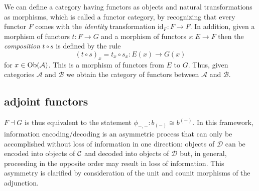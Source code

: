 \begin{frame}
We can define a category having functors as objects and natural transformations as morphisms, which is called a functor category, by recognizing that every functor $F$ comes with the {\it identity} transformation $\text{id}_F : F \to F$. In addition, given a morphism of
functors $t : F \to G$ and a morphism of functors $s : E \to F$
then the {\it composition} $t \circ s$ is defined by the rule
$$
(t \circ s)_x = t_x \circ s_x : E(x) \to G(x)
$$
for $x \in \mathop{\rm Ob}\nolimits(\mathcal{A})$.
This is a morphism of functors
from $E$ to $G$.
Thus, given categories
$\mathcal{A}$ and $\mathcal{B}$ we obtain the category of functors between $\mathcal{A}$ and
$\mathcal{B}$.
\end{frame}


\subsection{adjoint functors}


\begin{frame}
$F \dashv G$ is thus equivalent to the statement $\phi_{-,-}:b_{(-)} \cong b^{(-)}$. In this framework, information encoding/decoding is an asymmetric process that can only be accomplished without loss of information in one direction: objects of $\mathcal{D}$ can be encoded into objects of ${\mathcal C}$ and decoded into objects of $\mathcal{D}$ but, in general, proceeding in the opposite order may result in loss of information. This asymmetry is clarified by consideration of the unit and counit morphisms of the adjunction.
\end{frame}

